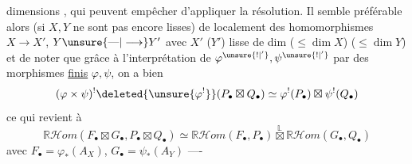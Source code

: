 
dimensions , qui peuvent empêcher d'appliquer la résolution. Il semble préférable alors  (si $X,Y$ ne sont pas encore lisses) de   localement des homomorphismes  $X\longrightarrow X'$, $Y\unsure{\text{---}|\longrightarrow}Y'$ avec $X'$ ($Y'$) lisse de dim ($\leq\dim X$) ($\leq\dim Y$) et de noter que grâce à l'interprétation de $\varphi^{\unsure{!|'}},\psi^{\unsure{!|'}}$ par des morphismes \uline{finis} $\varphi,\psi$, on a bien
\[
(\varphi\times\psi)^!\deleted{\unsure{\varphi^!}}(P_\bullet\boxtimes Q_\bullet)\simeq\varphi^!(P_\bullet)\boxtimes\psi^!(Q_\bullet)
\]
ce qui revient à
\[
\mathbb{R}\mathcal{H}om(F_\bullet\boxtimes G_\bullet,P_\bullet\boxtimes Q_\bullet)\simeq\mathbb{R}\mathcal{H}om(F_\bullet,P_\bullet)\overset{\mathbb{L}}{\boxtimes}\mathbb{R}\mathcal{H}om(G_\bullet,Q_\bullet)
\]
avec $F_\bullet=\varphi_*(A_X)$, $G_\bullet=\psi_*(A_Y)$ ----
